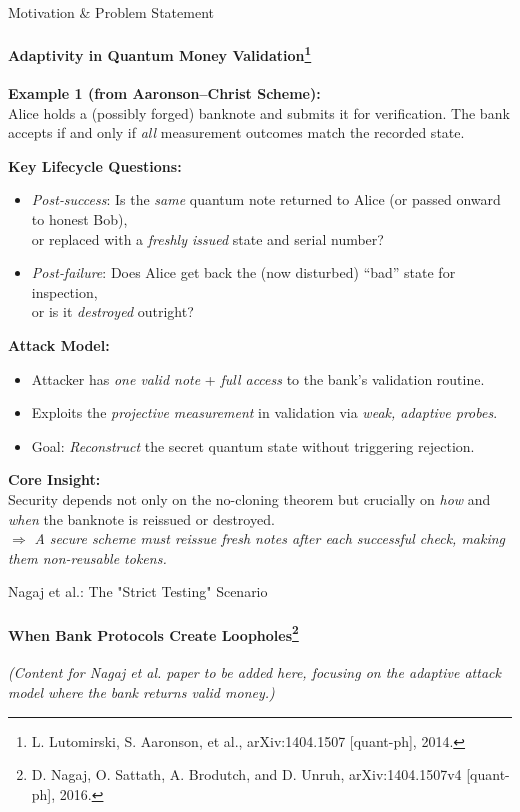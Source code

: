 \documentclass{beamer}
\begin{document}
\begin{frame}{Motivation \& Problem Statement}
    \framesubtitle{Adaptivity in Quantum Money Validation\footnote{L. Lutomirski, S. Aaronson, et al., arXiv:1404.1507 [quant-ph], 2014.}}
    
    \textbf{Example 1 (from Aaronson–Christ Scheme):}\\
    Alice holds a (possibly forged) banknote and submits it for verification.  The bank accepts if and only if \emph{all} measurement outcomes match the recorded state.  
    \pause
    
    \textbf{Key Lifecycle Questions:}
    \begin{itemize}
        \item \emph{Post‐success}: Is the \emph{same} quantum note returned to Alice (or passed onward to honest Bob), \\
            or replaced with a \emph{freshly issued} state and serial number?
        \item \emph{Post‐failure}: Does Alice get back the (now disturbed) “bad” state for inspection, \\
            or is it \emph{destroyed} outright?
    \end{itemize}
    \pause
    
    \textbf{Attack Model:}
    \begin{itemize}
        \item Attacker has \emph{one valid note} + \emph{full access} to the bank’s validation routine.
        \item Exploits the \emph{projective measurement} in validation via \emph{weak, adaptive probes}.
        \item Goal: \emph{Reconstruct} the secret quantum state without triggering rejection.
    \end{itemize}
    \pause

    \textbf{Core Insight:}\\
    Security depends not only on the no-cloning theorem but crucially on \emph{how} and \emph{when} the banknote is reissued or destroyed.  
    \\
    \hfill\(\Rightarrow\) \emph{A secure scheme must reissue fresh notes after each successful check, making them non-reusable tokens.}
\end{frame}



\begin{frame}{Nagaj et al.: The "Strict Testing" Scenario}
    \framesubtitle{When Bank Protocols Create Loopholes\footnote{D. Nagaj, O. Sattath, A. Brodutch, and D. Unruh, arXiv:1404.1507v4 [quant-ph], 2016.}}
    \vspace{1cm}
    \centering
    \textit{(Content for Nagaj et al. paper to be added here, focusing on the adaptive attack model where the bank returns valid money.)}
\end{frame}
\end{document}
